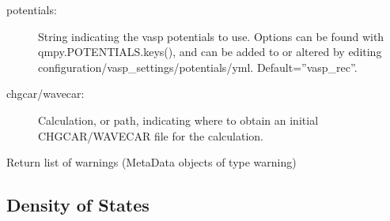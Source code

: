 \documentclass[letterpaper,10pt,english]{sphinxmanual}
\begin{document}
\begin{fulllineitems}
\begin{fulllineitems}
\begin{description}
\begin{description}
\item[{potentials:}] \leavevmode
String indicating the vasp potentials to use. Options can be 
found with qmpy.POTENTIALS.keys(), and can be added to or
altered by editing configuration/vasp\_settings/potentials/yml.
Default=''vasp\_rec''.

\item[{chgcar/wavecar:}] \leavevmode
Calculation, or path, indicating where to obtain an initial
CHGCAR/WAVECAR file for the calculation.

\end{description}

\end{description}

\end{fulllineitems}


\begin{fulllineitems}
\label{models:qmpy.Calculation.warning_objects}
Return list of warnings (MetaData objects of type warning)

\end{fulllineitems}


\end{fulllineitems}



\subsection{Density of States}
\label{models:density-of-states}
\end{document}
